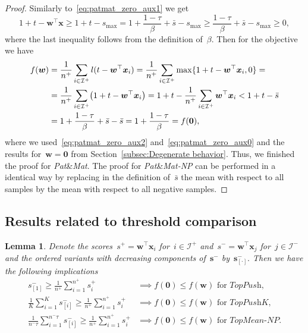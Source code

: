 \documentclass[11pt,a4paper]{article}
\newtheorem{lemma}[thm]{Lemma}
\theoremstyle{definition}
\let\originalleft\left
\let\originalright\right
\renewcommand{\left}{\mathopen{}\mathclose\bgroup\originalleft}
\renewcommand{\right}{\aftergroup\egroup\originalright}
\newcommand{\I}{\mathcal{I}}
\newcommand{\toppush}{\textit{TopPush}\xspace}
\newcommand{\toppushk}{\textit{TopPush$K$}\xspace}
\newcommand{\patmat}{\textit{Pat}\textup{\&}\textit{Mat}\xspace}
\newcommand{\patmatnp}{\textit{Pat}\textup{\&}\textit{Mat-NP}\xspace}
\newcommand{\topmeannp}{\textit{TopMean-NP}\xspace}
\begin{document}
\begin{proof}
  Similarly to~\eqref{eq:patmat_zero_aux1} we get
  \begin{equation*}
    1 + t - \bm{w}^\top \bm{x} \ge 1 + t - s_{\max}
                               =   1 + \frac{1-\tau}{\beta} + \bar{s} - s_{\max}
                               \ge \frac{1-\tau}{\beta} + \bar{s} - s_{\max}
                               \ge 0,
  \end{equation*}
  where the last inequality follows from the definition of~$\beta.$ Then for the objective we have
  \begin{equation}\label{eq:patmat_zero_aux2}
    \begin{aligned}
      f(\bm{w}) & = \frac{1}{n^+} \sum_{i \in \I^+} l(t-\bm{w}^\top \bm{x}_i)
                  = \frac{1}{n^+} \sum_{i \in \I^+} \max\{1 + t - \bm{w}^\top \bm{x}_i, 0\} = \\
                & = \frac{1}{n^+} \sum_{i \in \I^+} \left(1 + t - \bm{w}^\top \bm{x}_i \right)
                  = 1 + t - \frac{1}{n^+}\sum_{i \in \I^+} \bm{w}^\top \bm{x}_i
                  < 1 + t - \bar{s} \\
                & = 1 + \frac{1 - \tau}{\beta} + \bar{s} -\bar{s}
                  = 1 + \frac{1 - \tau}{\beta}
                  = f(\bm{0}),\\
    \end{aligned}
  \end{equation}
  where we used~\eqref{eq:patmat_zero_aux2} and~\eqref{eq:patmat_zero_aux0} and the results for~$\bm{w} = \bm{0}$ from Section~\ref{subsec:Degenerate behavior}. Thus, we finished the proof for \patmat. The proof for \patmatnp can be performed in a identical way by replacing in the definition of~$\bar{s}$ the mean with respect to all samples by the mean with respect to all negative samples.
\end{proof}


\subsection{Results related to threshold comparison}

\begin{lemma}\label{lemma:bound}
  Denote the scores~$s^+ = \bm{w}^\top \bm{x}_i$ for~$i \in \I^+$ and~$s^- = \bm{w}^\top \bm{x}_j$ for~$j \in \I^-$ and the ordered variants with decreasing components of~$\bm{s}^-$ by~$\bm{s}_{[\cdot]}^-.$ Then we have the following implications
  \begin{align*}
    s_{[1]}^- \ge \frac{1}{n^+} \sum_{i=1}^{n^+} s_{i}^+
    & \implies f(\bm{0}) \le f(\bm{w}) \text{ for } \toppush, \\
    \frac{1}{K} \sum_{i=1}^{K} s_{[i]}^- \ge \frac{1}{n^+} \sum_{i=1}^{n^+} s_{i}^+
    & \implies f(\bm{0}) \le f(\bm{w}) \text{ for }\toppushk, \\
    \frac{1}{n^-\tau} \sum_{i=1}^{n^- \tau} s_{[i]}^- \ge \frac{1}{n^+} \sum_{i=1}^{n^+} s_{i}^+
    & \implies f(\bm{0}) \le f(\bm{w}) \text{ for } \topmeannp. \\
  \end{align*}
\end{lemma}
\end{document}
